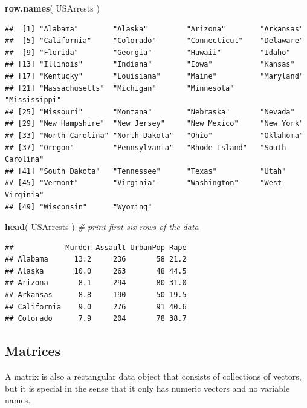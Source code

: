 \documentclass[]{book}
\newenvironment{Shaded}{\begin{snugshade}}{\end{snugshade}}
\newcommand{\CommentTok}[1]{\textcolor[rgb]{0.56,0.35,0.01}{\textit{#1}}}
\newcommand{\KeywordTok}[1]{\textcolor[rgb]{0.13,0.29,0.53}{\textbf{#1}}}
\newcommand{\NormalTok}[1]{#1}
\theoremstyle{definition}
\theoremstyle{definition}
\theoremstyle{definition}
\theoremstyle{remark}
\begin{document}
\begin{Shaded}
\begin{Highlighting}[]
\KeywordTok{row.names}\NormalTok{( USArrests )}
\end{Highlighting}
\end{Shaded}

\begin{verbatim}
##  [1] "Alabama"        "Alaska"         "Arizona"        "Arkansas"      
##  [5] "California"     "Colorado"       "Connecticut"    "Delaware"      
##  [9] "Florida"        "Georgia"        "Hawaii"         "Idaho"         
## [13] "Illinois"       "Indiana"        "Iowa"           "Kansas"        
## [17] "Kentucky"       "Louisiana"      "Maine"          "Maryland"      
## [21] "Massachusetts"  "Michigan"       "Minnesota"      "Mississippi"   
## [25] "Missouri"       "Montana"        "Nebraska"       "Nevada"        
## [29] "New Hampshire"  "New Jersey"     "New Mexico"     "New York"      
## [33] "North Carolina" "North Dakota"   "Ohio"           "Oklahoma"      
## [37] "Oregon"         "Pennsylvania"   "Rhode Island"   "South Carolina"
## [41] "South Dakota"   "Tennessee"      "Texas"          "Utah"          
## [45] "Vermont"        "Virginia"       "Washington"     "West Virginia" 
## [49] "Wisconsin"      "Wyoming"
\end{verbatim}

\begin{Shaded}
\begin{Highlighting}[]
\KeywordTok{head}\NormalTok{( USArrests )  }\CommentTok{# print first six rows of the data}
\end{Highlighting}
\end{Shaded}

\begin{verbatim}
##            Murder Assault UrbanPop Rape
## Alabama      13.2     236       58 21.2
## Alaska       10.0     263       48 44.5
## Arizona       8.1     294       80 31.0
## Arkansas      8.8     190       50 19.5
## California    9.0     276       91 40.6
## Colorado      7.9     204       78 38.7
\end{verbatim}

\hypertarget{matrices}{%
\subsection{Matrices}\label{matrices}}

A matrix is also a rectangular data object that consists of collections
of vectors, but it is special in the sense that it only has numeric
vectors and no variable names.
\end{document}

